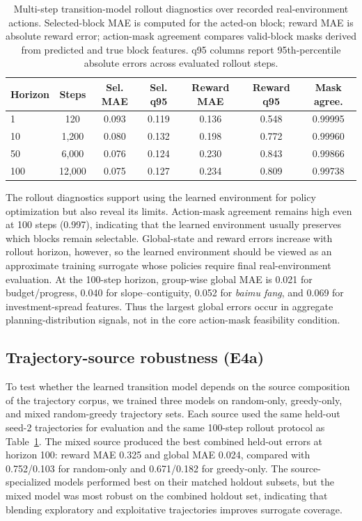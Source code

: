 \documentclass[11pt]{article}
\begin{document}
\begin{table}[htbp]
\centering
\scriptsize
\setlength{\tabcolsep}{4pt}
\caption{Multi-step transition-model rollout diagnostics over recorded real-environment actions. Selected-block MAE is computed for the acted-on block; reward MAE is absolute reward error; action-mask agreement compares valid-block masks derived from predicted and true block features. q95 columns report 95th-percentile absolute errors across evaluated rollout steps.}
\label{tab:rollout_diag}
\begin{tabular}{lcccccc}
\toprule
Horizon & Steps & Sel. MAE & Sel. q95 & Reward MAE & Reward q95 & Mask agree. \\
\midrule
1   & 120    & 0.093 & 0.119 & 0.136 & 0.548 & 0.99995 \\
10  & 1{,}200 & 0.080 & 0.132 & 0.198 & 0.772 & 0.99960 \\
50  & 6{,}000 & 0.076 & 0.124 & 0.230 & 0.843 & 0.99866 \\
100 & 12{,}000 & 0.075 & 0.127 & 0.234 & 0.809 & 0.99738 \\
\bottomrule
\end{tabular}
\end{table}

The rollout diagnostics support using the learned environment for policy optimization but also reveal its limits. Action-mask agreement remains high even at 100 steps (0.997), indicating that the learned environment usually preserves which blocks remain selectable. Global-state and reward errors increase with rollout horizon, however, so the learned environment should be viewed as an approximate training surrogate whose policies require final real-environment evaluation. At the 100-step horizon, group-wise global MAE is 0.021 for budget/progress, 0.040 for slope--contiguity, 0.052 for \textit{baimu fang}, and 0.069 for investment-spread features. Thus the largest global errors occur in aggregate planning-distribution signals, not in the core action-mask feasibility condition.

\subsection{Trajectory-source robustness (E4a)}

To test whether the learned transition model depends on the source composition of the trajectory corpus, we trained three models on random-only, greedy-only, and mixed random-greedy trajectory sets. Each source used the same held-out seed-2 trajectories for evaluation and the same 100-step rollout protocol as Table~\ref{tab:rollout_diag}. The mixed source produced the best combined held-out errors at horizon 100: reward MAE 0.325 and global MAE 0.024, compared with 0.752/0.103 for random-only and 0.671/0.182 for greedy-only. The source-specialized models performed best on their matched holdout subsets, but the mixed model was most robust on the combined holdout set, indicating that blending exploratory and exploitative trajectories improves surrogate coverage.
\end{document}
